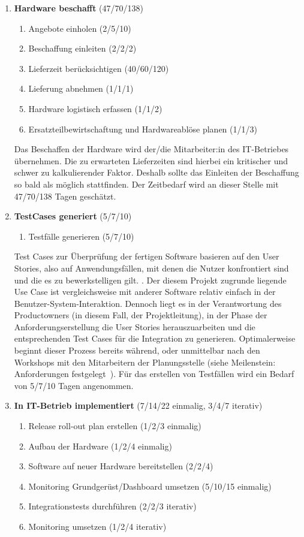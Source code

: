 \begin{enumerate}
	\item \textbf{Hardware beschafft} (47/70/138)
	\begin{enumerate}
		\item Angebote einholen (2/5/10)
		\item Beschaffung einleiten (2/2/2)
		\item Lieferzeit berücksichtigen (40/60/120)
		\item Lieferung abnehmen (1/1/1)
		\item Hardware logistisch erfassen (1/1/2)
		\item Ersatzteilbewirtschaftung und Hardwareablöse planen (1/1/3)
	\end{enumerate}
	
	Das Beschaffen der Hardware wird der/die Mitarbeiter:in des IT-Betriebes übernehmen. Die zu erwarteten Lieferzeiten sind hierbei ein kritischer und schwer zu kalkulierender Faktor. Deshalb sollte das Einleiten der Beschaffung so bald als möglich stattfinden. Der Zeitbedarf wird an dieser Stelle mit 47/70/138 Tagen geschätzt.

	\item \textbf{TestCases generiert} (5/7/10)
		\begin{enumerate}
		\item Testfälle generieren (5/7/10)
	\end{enumerate}
	
Test Cases zur Überprüfung der fertigen Software basieren auf den User Stories, also auf Anwendungsfällen, mit denen die Nutzer konfrontiert sind und die es zu bewerkstelligen gilt. \citep[S.12]{microtool_gmbh_use_2017}. Der diesem Projekt zugrunde liegende Use Case \citep{grunsky_rettungsdienst_2024} ist vergleichsweise mit anderer Software relativ einfach in der Benutzer-System-Interaktion. Dennoch liegt es in der Verantwortung des Productowners (in diesem Fall, der Projektleitung), in der Phase der Anforderungserstellung die User Stories herauszuarbeiten und die entsprechenden Test Cases für die Integration zu generieren. Optimalerweise beginnt dieser Prozess bereits während, oder unmittelbar nach den Workshops mit den Mitarbeitern der Planungsstelle (siehe Meilenstein: \glqq Anforderungen festgelegt\grqq\ ). Für das erstellen von Testfällen wird ein Bedarf von 5/7/10 Tagen angenommen.
	
	\item \textbf{In IT-Betrieb implementiert} (7/14/22 einmalig, 3/4/7 iterativ)
	\begin{enumerate}
		\item Release roll-out plan erstellen (1/2/3 einmalig)
		\item Aufbau der Hardware (1/2/4 einmalig)
		\item Software auf neuer Hardware bereitstellen (2/2/4)
		\item Monitoring Grundgerüst/Dashboard umsetzen (5/10/15 einmalig)
		\item Integrationstests durchführen (2/2/3 iterativ)
		\item Monitoring umsetzen (1/2/4 iterativ)
	\end{enumerate}
	

\end{enumerate}
